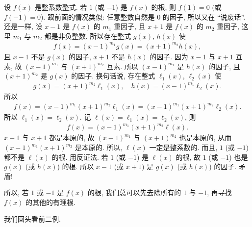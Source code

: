 \begin{remark}
    设 $f(x)$ 是整系数整式. 若 $1$ (或 $-1$) 是 $f(x)$ 的根, 则 $f(1) = 0$ (或 $f(-1) = 0$). 跟前面的情况类似: 任意整数自然是 $0$ 的因子, 所以又在 ``说废话''. 还是一样, 设 $x - 1$ 是 $f(x)$ 的 $m_1$ 重因子, 且 $x + 1$ 是 $f(x)$ 的 $m_2$ 重因子, 这里 $m_1$ 与 $m_2$ 都是非负整数. 所以存在整式 $g(x)$, $h(x)$ 使
    \begin{align*}
        f(x) = (x - 1)^{m_1} g(x) = (x + 1)^{m_2} h(x),
    \end{align*}
    且 $x-1$ 不是 $g(x)$ 的因子, $x+1$ 不是 $h(x)$ 的因子. 因为 $x-1$ 与 $x+1$ 互素, 故 $(x-1)^{m_1}$ 与 $(x+1)^{m_2}$ 互素. 所以 $(x-1)^{m_1}$ 是 $h(x)$ 的因子, 且 $(x+1)^{m_2}$ 是 $g(x)$ 的因子. 换句话说, 存在整式 $\ell_1 (x)$, $\ell_2 (x)$ 使
    \begin{align*}
        g(x) = (x+1)^{m_2} \ell_1 (x), \quad h(x) = (x-1)^{m_1} \ell_2 (x).
    \end{align*}
    所以
    \begin{align*}
        f(x) = (x-1)^{m_1} (x+1)^{m_2} \ell_1 (x) = (x-1)^{m_1} (x+1)^{m_2} \ell_2 (x).
    \end{align*}
    所以 $\ell_1 (x) = \ell_2 (x)$. 记 $\ell (x) = \ell_1 (x) = \ell_2 (x)$, 则
    \begin{align*}
        f(x) = (x-1)^{m_1} (x+1)^{m_2} \ell (x).
    \end{align*}
    $x-1$ 与 $x+1$ 都是本原的, 故 $(x-1)^{m_1}$ 与 $(x+1)^{m_2}$ 也是本原的, 从而 $(x-1)^{m_1} (x+1)^{m_2}$ 是本原的. 所以, $\ell (x)$ 一定是整系数的. 而且, $1$ (或 $-1$) 都不是 $\ell (x)$ 的根. 用反证法. 若 $1$ (或 $-1$) 是 $\ell (x)$ 的根, 故 $1$ (或 $-1$) 也是 $g(x)$ (或 $h(x)$) 的根. 所以 $x-1$ (或 $x+1$) 是 $g(x)$ (或 $h(x)$) 的因子. 矛盾!

    所以, 若 $1$ 或 $-1$ 是 $f(x)$ 的根, 我们总可以先去除所有的 $1$ 与 $-1$, 再寻找 $f(x)$ 的其他的有理根.
\end{remark}

我们回头看前二例.

